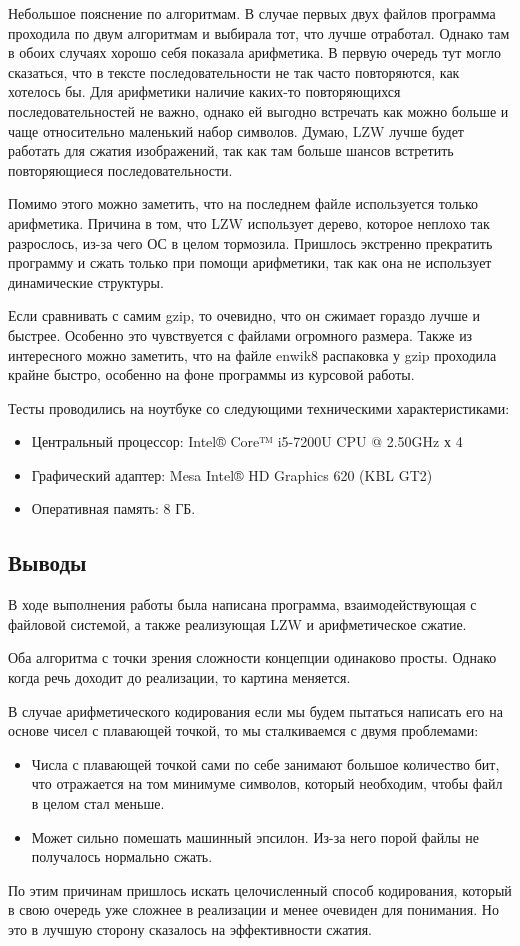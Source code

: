 \documentclass[12pt]{article}
\begin{document}
Небольшое пояснение по алгоритмам. В случае первых двух файлов программа проходила по двум алгоритмам и выбирала тот, что лучше отработал. Однако там в обоих случаях хорошо себя показала арифметика. В первую очередь тут могло сказаться, что в тексте последовательности не так часто повторяются, как хотелось бы. Для арифметики наличие каких-то повторяющихся последовательностей не важно, однако ей выгодно встречать как можно больше и чаще относительно маленький набор символов. Думаю, LZW лучше будет работать для сжатия изображений, так как там больше шансов встретить повторяющиеся последовательности.

Помимо этого можно заметить, что на последнем файле используется только арифметика. Причина в том, что LZW использует дерево, которое неплохо так разрослось, из-за чего ОС в целом тормозила. Пришлось экстренно прекратить программу и сжать только при помощи арифметики, так как она не использует динамические структуры.

Если сравнивать с самим gzip, то очевидно, что он сжимает гораздо лучше и быстрее. Особенно это чувствуется с файлами огромного размера. Также из интересного можно заметить, что на файле enwik8 распаковка у gzip проходила крайне быстро, особенно на фоне программы из курсовой работы.

Тесты проводились на ноутбуке со следующими техническими характеристиками:
\begin{itemize}
    \item Центральный процессор: Intel® Core™ i5-7200U CPU @ 2.50GHz х 4
    \item Графический адаптер: Mesa Intel® HD Graphics 620 (KBL GT2)
    \item Оперативная память: 8 ГБ.
\end{itemize}   

\subsection*{Выводы}

В ходе выполнения работы была написана программа, взаимодействующая с файловой системой, а также реализующая LZW и арифметическое сжатие.

Оба алгоритма с точки зрения сложности концепции одинаково просты. Однако когда речь доходит до реализации, то картина меняется.

В случае арифметического кодирования если мы будем пытаться написать его на основе чисел с плавающей точкой, то мы сталкиваемся с двумя проблемами:
\begin{itemize}
    \item Числа с плавающей точкой сами по себе занимают большое количество бит, что отражается на том минимуме символов, который необходим, чтобы файл в целом стал меньше.
    \item Может сильно помешать машинный эпсилон. Из-за него порой файлы не получалось нормально сжать.
\end{itemize}
По этим причинам пришлось искать целочисленный способ кодирования, который в свою очередь уже сложнее в реализации и менее очевиден для понимания. Но это в лучшую сторону сказалось на эффективности сжатия.
\end{document}
